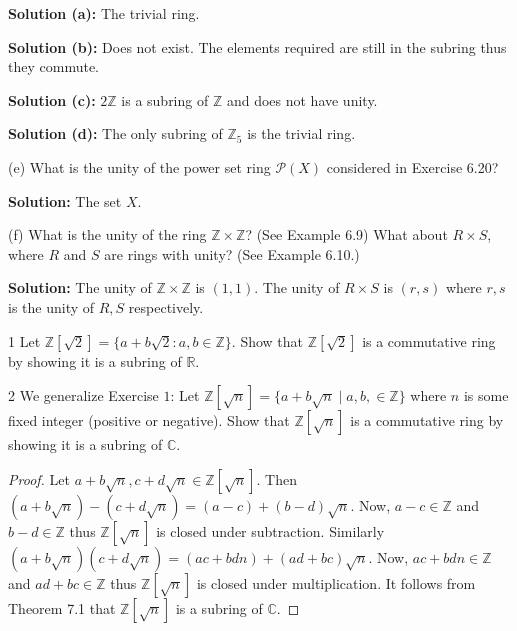 \textbf{Solution (a):} The trivial ring.

\textbf{Solution (b):} Does not exist. The elements required are still in the subring 
thus they commute.

\textbf{Solution (c):} $2\mathbb{Z}$ is a subring of $\mathbb{Z}$ and does not have unity.

\textbf{Solution (d):} The only subring of $\mathbb{Z}_5$ is the trivial ring.

\begin{problem}[Warmup]{(e)}
    What is the unity of the power set ring $\mathcal{P}(X)$ considered in Exercise 6.20?
\end{problem}
\solved

\textbf{Solution:} The set $X$.

\begin{problem}[Warmup]{(f)}
    What is the unity of the ring $\mathbb{Z} \times \mathbb{Z}$? (See Example 6.9) What 
    about $R \times S$, where $R$ and $S$ are rings with unity? (See Example 6.10.)
\end{problem}
\solved

\textbf{Solution:} The unity of $\mathbb{Z} \times \mathbb{Z}$ is $(1, 1)$.
The unity of $R \times S$ is $(r, s)$ where $r, s$ is the unity of $R, S$ respectively.

\begin{problem}{1}
    Let $\mathbb{Z}[\sqrt{2}] = \{a + b\sqrt{2} : a, b \in \mathbb{Z}\}$. Show that
    $\mathbb{Z}[\sqrt{2}]$ is a commutative ring by showing it is a subring of $\mathbb{R}$.
\end{problem}
\unsolved

\begin{problem}{2}
    We generalize Exercise $1$: Let $\mathbb{Z}[\sqrt{n}] = 
    \{a + b\sqrt{n} \mid a, b, \in \mathbb{Z}\}$ where 
    $n$ is some fixed integer (positive or negative).
    Show that $\mathbb{Z}[\sqrt{n}]$ is a commutative 
    ring by showing it is a subring of $\mathbb{C}$.
\end{problem}
\solved

\begin{proof}
    Let $a + b\sqrt{n}, c + d\sqrt{n} \in \mathbb{Z}[\sqrt{n}]$.
    Then $(a + b\sqrt{n}) - (c + d\sqrt{n}) = (a - c) + (b - d)\sqrt{n}$.
    Now, $a - c \in \mathbb{Z}$ and $b - d \in \mathbb{Z}$ thus $\mathbb{Z}[\sqrt{n}]$ is closed under subtraction.
    Similarly $(a + b\sqrt{n})(c + d\sqrt{n}) = (ac + bdn) + (ad + bc)\sqrt{n}$.
    Now, $ac + bdn \in \mathbb{Z}$ and $ad + bc \in \mathbb{Z}$ thus $\mathbb{Z}[\sqrt{n}]$ is closed under multiplication.
    It follows from Theorem 7.1 that $\mathbb{Z}[\sqrt{n}]$ is a subring of $\mathbb{C}$.
\end{proof}

